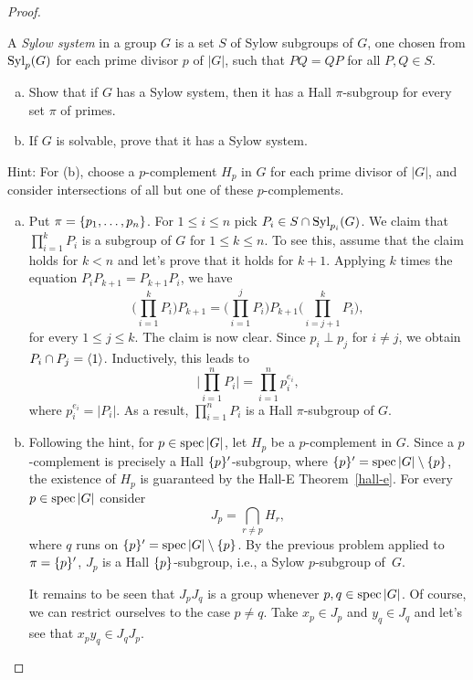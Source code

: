 \begin{proof}
\begin{probl}
    A \textsl{Sylow system} in a group\/ $G$ is a set\/ $S$ of Sylow subgroups of\/ $G$, one chosen from\/ ${\rm Syl}_p(G)$ for each prime divisor\/ $p$ of\/ $|G|$, such that\/ $PQ = QP$ for all\/ $P,Q \in S$.
    \begin{enumerate}[a),font=\upshape]
    \item Show that if\/ $G$ has a Sylow system, then it has a Hall\/ $\pi$-subgroup for every set\/ $\pi$ of primes.
    \item If\/ $G$ is solvable, prove that it has a Sylow system.
    \end{enumerate}
    {\upshape Hint: For (b), choose a $p$-complement $H_p$ in $G$ for each prime divisor of $|G|$, and consider intersections of all but one of these $p$-complements.}
\end{probl}

\begin{solution}

\begin{enumerate}[a),font=\upshape]
    \item Put $\pi=\{p_1,\dots,p_n\}$. For $1\le i\le n$ pick $P_i\in S\cap{\rm Syl}_{p_i}(G)$. We claim that $\prod_{i=1}^kP_i$ is a subgroup of $G$ for $1\le k\le n$. To see this, assume that the claim holds for $k<n$ and let's prove that it holds for $k+1$. Applying $k$ times the equation $P_iP_{k+1}=P_{k+1}P_i$, we have
    $$
        \Big(\prod_{i=1}^kP_i\Big)P_{k+1}
            = \Big(\prod_{i=1}^jP_i\Big)P_{k+1}\Big(\prod_{i=j+1}^kP_i\Big),
    $$
    for every $1\le j\le k$. The claim is now clear. Since $p_i\perp p_j$ for $i\ne j$, we obtain $P_i\cap P_j=\langle1\rangle$. Inductively, this leads to
    $$
        \Big|\prod_{i=1}^nP_i\Big| = \prod_{i=1}^np_i^{e_i},
    $$
    where $p_i^{e_i}=|P_i|$. As a result, $\prod_{i=1}^nP_i$ is a Hall $\pi$-subgroup of $G$.

    \item Following the hint, for $p\in\operatorname{spec}|G|$, let $H_p$ be a $p$-complement in $G$. Since a $p$-complement is precisely a Hall $\{p\}'$-subgroup, where $\{p\}'=\operatorname{spec}|G|\setminus\{p\}$, the existence of $H_p$ is guaranteed by the Hall-E Theorem~\ref{hall-e}. For every $p\in\operatorname{spec}|G|$ consider
    $$
        J_p = \bigcap_{r\ne p}H_r,
    $$
    where $q$ runs on $\{p\}'=\operatorname{spec}|G|\setminus\{p\}$. By the previous problem applied to $\pi=\{p\}'$, $J_p$ is a Hall $\{p\}$-subgroup, i.e., a Sylow $p$-subgroup of~$G$.

    It remains to be seen that $J_pJ_q$ is a group whenever $p,q\in\operatorname{spec}|G|$. Of course, we can restrict ourselves to the case $p\ne q$. Take $x_p\in J_p$ and $y_q\in J_q$ and let's see that $x_py_q\in J_qJ_p$. 
    

\end{enumerate}
\end{solution}
\end{proof}

